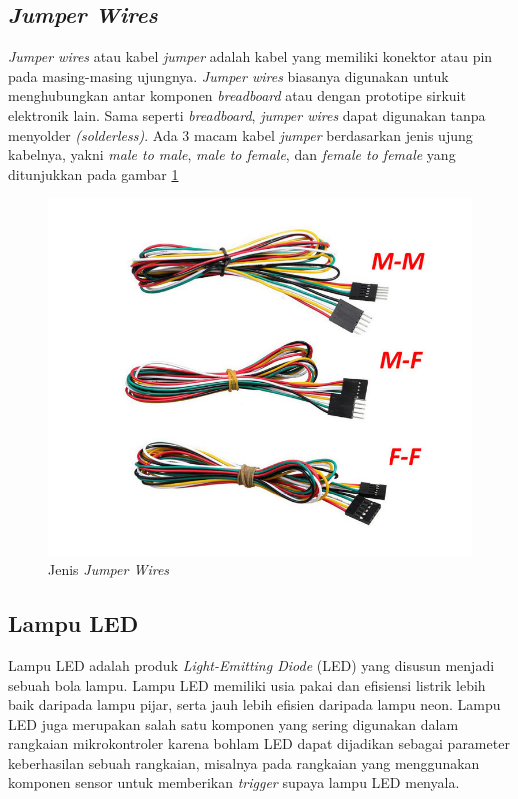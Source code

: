 \subsection{\textit{Jumper Wires}}
\tab \textit{Jumper wires} atau kabel \textit{jumper} adalah kabel yang memiliki konektor atau pin pada masing-masing ujungnya. \textit{Jumper wires} biasanya digunakan untuk menghubungkan antar komponen \textit{breadboard} atau dengan prototipe sirkuit elektronik lain. Sama seperti \textit{breadboard}, \textit{jumper wires} dapat digunakan tanpa menyolder \textit{(solderless)}. Ada 3 macam kabel \textit{jumper} berdasarkan jenis ujung kabelnya, yakni \textit{male to male}, \textit{male to female}, dan \textit{female to female} yang ditunjukkan pada gambar \ref{figure:jumperwires}

\begin{figure}[H]
	\centerline {
		\includegraphics[width=\linewidth]{bab3/img/jumperwires.png}
	}
	\caption{Jenis \textit{Jumper Wires}}
	\label{figure:jumperwires}
\end{figure}
 
\subsection{Lampu LED}
\tab Lampu LED adalah produk \textit{Light-Emitting Diode} (LED) yang disusun menjadi sebuah bola lampu. Lampu LED memiliki usia pakai dan efisiensi listrik lebih baik daripada lampu pijar, serta jauh lebih efisien daripada lampu neon. Lampu LED juga merupakan salah satu komponen yang sering digunakan dalam rangkaian mikrokontroler karena bohlam LED dapat dijadikan sebagai parameter keberhasilan sebuah rangkaian, misalnya pada rangkaian yang menggunakan komponen sensor untuk memberikan \textit{trigger} supaya lampu LED menyala.


